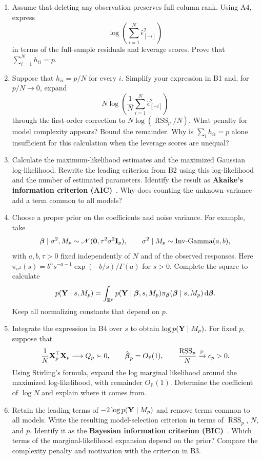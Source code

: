 \begin{enumerate}[label=\textcolor{AccentInk}{\sffamily\bfseries B\arabic*.},
                  ref=B\arabic*,leftmargin=2.65em,labelsep=0.65em,itemsep=1em]
\item Assume that deleting any observation preserves full column rank.
Using A4, express
\[
    \log\!\left(\sum_{i=1}^N\hat\epsilon_{[-i]}^2\right)
\]
in terms of the full-sample residuals and leverage scores. Prove that
$\sum_{i=1}^N h_{ii}=p$.

\item Suppose that $h_{ii}=p/N$ for every $i$. Simplify your expression in B1
and, for $p/N\to0$, expand
\[
    N\log\!\left(\frac1N\sum_{i=1}^N\hat\epsilon_{[-i]}^2\right)
\]
through the first-order correction to $N\log(\operatorname{RSS}_p/N)$.
What penalty for model complexity appears? Bound the remainder.
Why is $\sum_i h_{ii}=p$ alone insufficient for this calculation when the
leverage scores are unequal?

\item Calculate the maximum-likelihood estimates and the maximized Gaussian
log-likelihood. Rewrite the leading criterion from B2 using this log-likelihood
and the number of estimated parameters. Identify the result as
\textbf{Akaike's information criterion (AIC)}~\cite{akaike1974newlook}.
Why does counting the unknown variance add a term common to all models?

\item Choose a proper prior on the coefficients and noise variance. For
example, take
\[
    \boldsymbol\beta\mid\sigma^2,M_p
    \sim\mathcal N(\mathbf0,\tau^2\sigma^2\mathbf{I}_p),
    \qquad
    \sigma^2\mid M_p\sim\operatorname{Inv\text{-}Gamma}(a,b),
\]
with $a,b,\tau>0$ fixed independently of $N$ and of the observed responses.
Here $\pi_{\sigma^2}(s)=b^a s^{-a-1}\exp(-b/s)/\Gamma(a)$ for $s>0$.
Complete the square to calculate
\[
    p(\mathbf{Y}\mid s,M_p)
    =\int_{\mathbb R^p}p(\mathbf{Y}\mid\boldsymbol\beta,s,M_p)
      \pi_{\boldsymbol\beta}(\boldsymbol\beta\mid s,M_p)
      \,\mathrm d\boldsymbol\beta.
\]
Keep all normalizing constants that depend on $p$.

\item Integrate the expression in B4 over $s$ to obtain
$\log p(\mathbf{Y}\mid M_p)$. For fixed $p$, suppose that
\[
    \frac1N\mathbf{X}_p^\top\mathbf{X}_p\longrightarrow Q_p\succ0,
    \qquad \hat{\boldsymbol\beta}_p=O_{\mathbb P}(1),
    \qquad \frac{\operatorname{RSS}_p}{N}
       \xrightarrow{\mathbb P}c_p>0.
\]
Using Stirling's formula, expand the log marginal likelihood around the maximized
log-likelihood, with remainder $O_{\mathbb P}(1)$. Determine the coefficient of
$\log N$ and explain where it comes from.

\item Retain the leading terms of $-2\log p(\mathbf{Y}\mid M_p)$ and remove terms
common to all models. Write the resulting model-selection criterion in terms of
$\operatorname{RSS}_p$, $N$, and $p$. Identify it as the
\textbf{Bayesian information criterion (BIC)}~\cite{schwarz1978dimension}.
Which terms of the marginal-likelihood expansion depend on the prior?
Compare the complexity penalty and motivation with the criterion in B3.
\end{enumerate}

